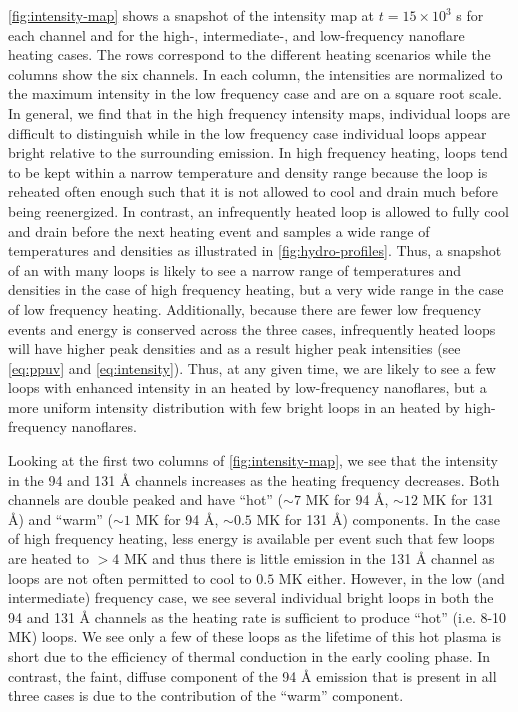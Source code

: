 \autoref{fig:intensity-map} shows a snapshot of the intensity map at $t=15\times10^3$ s for each channel and for the high-, intermediate-, and low-frequency nanoflare heating cases. The rows correspond to the different heating scenarios while the columns show the six channels. In each column, the intensities are normalized to the maximum intensity in the low frequency case and are on a square root scale. In general, we find that in the high frequency intensity maps, individual loops are difficult to distinguish while in the low frequency case individual loops appear bright relative to the surrounding emission. In high frequency heating, loops tend to be kept within a narrow temperature and density range because the loop is reheated often enough such that it is not allowed to cool and drain much before being reenergized. In contrast, an infrequently heated loop is allowed to fully cool and drain before the next heating event and samples a wide range of temperatures and densities as illustrated in \autoref{fig:hydro-profiles}. Thus, a snapshot of an \AR{} with many loops is likely to see a narrow range of temperatures and densities in the case of high frequency heating, but a very wide range in the case of low frequency heating. Additionally, because there are fewer low frequency events and energy is conserved across the three cases, infrequently heated loops will have higher peak densities and as a result higher peak intensities (see \autoref{eq:ppuv} and \ref{eq:intensity}). Thus, at any given time, we are likely to see a few loops with enhanced intensity in an \AR{} heated by low-frequency nanoflares, but a more uniform intensity distribution with few bright loops in an \AR{} heated by high-frequency nanoflares.

Looking at the first two columns of \autoref{fig:intensity-map}, we see that the intensity in the 94 and 131 \AA{} channels increases as the heating frequency decreases. Both channels are double peaked and have ``hot'' ($\sim7$ MK for 94 \AA{}, $\sim12$ MK for 131 \AA{}) and ``warm'' ($\sim1$ MK for 94 \AA{}, $\sim0.5$ MK for 131 \AA{}) components. In the case of high frequency heating, less energy is available per event such that few loops are heated to $>4$ MK and thus there is little emission in the 131 \AA{} channel as loops are not often permitted to cool to $0.5$ MK either. However, in the low (and intermediate) frequency case, we see several individual bright loops in both the 94 and 131 \AA{} channels as the heating rate is sufficient to produce ``hot'' (i.e. 8-10 MK) loops. We see only a few of these loops as the lifetime of this hot plasma is short due to the efficiency of thermal conduction in the early cooling phase. In contrast, the faint, diffuse component of the 94 \AA{} emission that is present in all three cases is due to the contribution of the ``warm'' component. 

